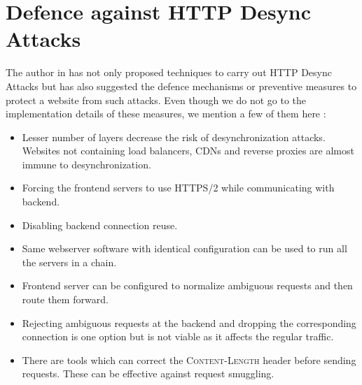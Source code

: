 \chapter{Defence against HTTP Desync Attacks}
The author in \cite{b6} has not only proposed techniques to carry out HTTP Desync Attacks but has also suggested the defence mechanisms or preventive measures to protect a website from such attacks. Even though we do not go to the implementation details of these measures, we mention a few of them here :
\begin{itemize}
	\item Lesser number of layers decrease the risk of desynchronization attacks. Websites not containing load balancers, CDNs and reverse proxies are almost immune to desynchronization. 
	\item Forcing the frontend servers to use HTTPS/2 \cite{b15} while communicating with backend. 
	\item Disabling backend connection reuse.
	\item Same webserver software with identical configuration can be used to run all the servers in a chain. 
	\item Frontend server can be configured to normalize ambiguous requests and then route them forward. 
	\item Rejecting ambiguous requests at the backend and dropping the corresponding connection is one option but is not viable as it affects the regular traffic. 
	\item There are tools which can correct the \textsc{Content-Length} header before sending requests. These can be effective against request smuggling. 
\end{itemize}

